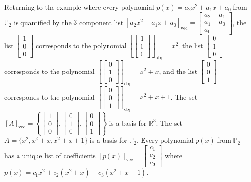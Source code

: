 \documentclass{article}
\begin{document}
\vspace{5mm}

Returning to the example where every polynomial \(p(x) = a_2 x^2 + a_1 x + a_0\) from \(\mathbb{P}_2\) is quantified by the \(3\) component list \([a_2 x^2 + a_1 x + a_0]_{\text{vec}} = \begin{bmatrix} a_2 - a_1 \\ a_1 - a_0 \\ a_0 \end{bmatrix}\), the list \(\begin{bmatrix} 1 \\ 0 \\ 0 \end{bmatrix}\) corresponds to the polynomial \(\left[\begin{bmatrix} 1 \\ 0 \\ 0 \end{bmatrix}\right]_{\text{obj}} = x^2\), the list \(\begin{bmatrix} 0 \\ 1 \\ 0 \end{bmatrix}\) corresponds to the polynomial \(\left[\begin{bmatrix} 0 \\ 1 \\ 0 \end{bmatrix}\right]_{\text{obj}} = x^2 + x\), and the list \(\begin{bmatrix} 0 \\ 0 \\ 1 \end{bmatrix}\) corresponds to the polynomial \(\left[\begin{bmatrix} 0 \\ 0 \\ 1 \end{bmatrix}\right]_{\text{obj}} = x^2 + x + 1\). The set \([A]_{\text{vec}} = \left\{\begin{bmatrix} 1 \\ 0 \\ 0 \end{bmatrix}, \begin{bmatrix} 0 \\ 1 \\ 0 \end{bmatrix}, \begin{bmatrix} 0 \\ 0 \\ 1 \end{bmatrix}\right\}\) is a basis for \(\mathbb{R}^3\). The set \(A = \{x^2 , x^2 + x, x^2 + x + 1\}\) is a basis for \(\mathbb{P}_2\). Every polynomial \(p(x)\) from \(\mathbb{P}_2\) has a unique list of coefficients \([p(x)]_{\text{vec}} = \begin{bmatrix} c_1 \\ c_2 \\ c_3 \end{bmatrix}\) where \(p(x) = c_1 x^2 + c_2 (x^2 + x) + c_3 (x^2 + x + 1)\).
\end{document}
